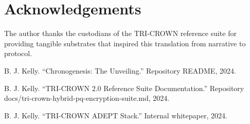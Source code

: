 \documentclass[11pt,a4paper]{article}
\begin{document}
\section*{Acknowledgements}
The author thanks the custodians of the TRI-CROWN reference suite for providing tangible substrates that inspired this translation from narrative to protocol.

\begin{thebibliography}{9}
B. J. Kelly. ``Chronogenesis: The Unveiling.'' Repository README, 2024.

B. J. Kelly. ``TRI-CROWN 2.0 Reference Suite Documentation.'' Repository docs/tri-crown-hybrid-pq-encryption-suite.md, 2024.

B. J. Kelly. ``TRI-CROWN ADEPT Stack.'' Internal whitepaper, 2024.
\end{thebibliography}
\end{document}
